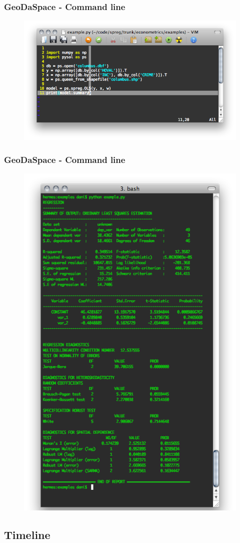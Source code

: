 \documentclass[nototal]{beamer}
\begin{document}
\begin{frame}
	\frametitle{GeoDaSpace - Command line}
  \begin{figure}
  \includegraphics[width=1\linewidth]{figs/script.png}
  \end{figure}
 \end{frame} 

\begin{frame}
	\frametitle{GeoDaSpace - Command line}
  \begin{figure}
  \includegraphics[height=0.65\linewidth]{figs/output.png}
  \end{figure}
 \end{frame} 

\subsection{Timeline} 
\end{document}

